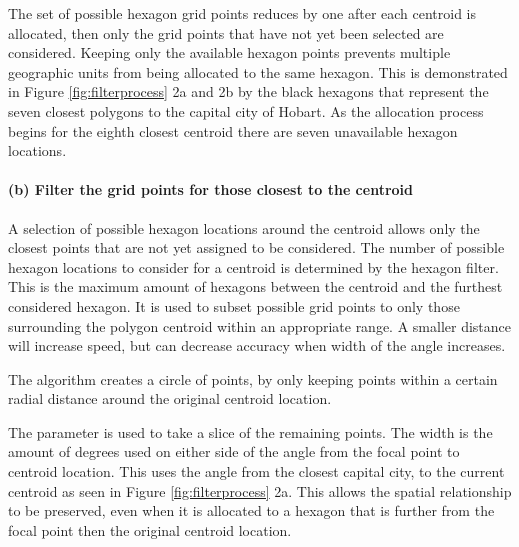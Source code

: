 The set of possible hexagon grid points reduces by one after each centroid is allocated, then only the grid points that have not yet been selected are considered. Keeping only the available hexagon points prevents multiple geographic units from being allocated to the same hexagon. This is demonstrated in Figure \ref{fig:filterprocess} 2a and 2b by the black hexagons that represent the seven closest polygons to the capital city of Hobart. As the allocation process begins for the eighth closest centroid there are seven unavailable hexagon locations.

\hypertarget{b-filter-the-grid-points-for-those-closest-to-the-centroid}{%
\paragraph{(b) Filter the grid points for those closest to the centroid}\label{b-filter-the-grid-points-for-those-closest-to-the-centroid}}

A selection of possible hexagon locations around the centroid allows only the closest points that are not yet assigned to be considered. The number of possible hexagon locations to consider for a centroid is determined by the hexagon filter. This is the maximum amount of hexagons between the centroid and the furthest considered hexagon. It is used to subset possible grid points to only those surrounding the polygon centroid within an appropriate range. A smaller distance will increase speed, but can decrease accuracy when width of the angle increases.

The algorithm creates a circle of points, by only keeping points within a certain radial distance around the original centroid location.

The  parameter is used to take a slice of the remaining points. The width is the amount of degrees used on either side of the angle from the focal point to centroid location. This uses the angle from the closest capital city, to the current centroid as seen in Figure \ref{fig:filterprocess} 2a. This allows the spatial relationship to be preserved, even when it is allocated to a hexagon that is further from the focal point then the original centroid location.

